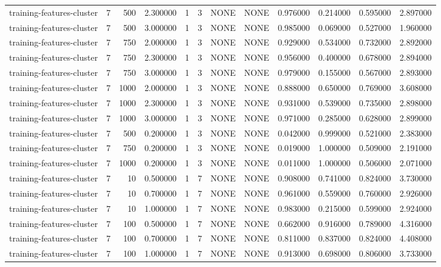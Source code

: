 \begin{tabular}{lrrrllllrrrr}
training-features-cluster & 7 & 500 & 2.300000 & 1 & 3 & NONE & NONE & 0.976000 & 0.214000 & 0.595000 & 2.897000 \\
training-features-cluster & 7 & 500 & 3.000000 & 1 & 3 & NONE & NONE & 0.985000 & 0.069000 & 0.527000 & 1.960000 \\
training-features-cluster & 7 & 750 & 2.000000 & 1 & 3 & NONE & NONE & 0.929000 & 0.534000 & 0.732000 & 2.892000 \\
training-features-cluster & 7 & 750 & 2.300000 & 1 & 3 & NONE & NONE & 0.956000 & 0.400000 & 0.678000 & 2.894000 \\
training-features-cluster & 7 & 750 & 3.000000 & 1 & 3 & NONE & NONE & 0.979000 & 0.155000 & 0.567000 & 2.893000 \\
training-features-cluster & 7 & 1000 & 2.000000 & 1 & 3 & NONE & NONE & 0.888000 & 0.650000 & 0.769000 & 3.608000 \\
training-features-cluster & 7 & 1000 & 2.300000 & 1 & 3 & NONE & NONE & 0.931000 & 0.539000 & 0.735000 & 2.898000 \\
training-features-cluster & 7 & 1000 & 3.000000 & 1 & 3 & NONE & NONE & 0.971000 & 0.285000 & 0.628000 & 2.899000 \\
training-features-cluster & 7 & 500 & 0.200000 & 1 & 3 & NONE & NONE & 0.042000 & 0.999000 & 0.521000 & 2.383000 \\
training-features-cluster & 7 & 750 & 0.200000 & 1 & 3 & NONE & NONE & 0.019000 & 1.000000 & 0.509000 & 2.191000 \\
training-features-cluster & 7 & 1000 & 0.200000 & 1 & 3 & NONE & NONE & 0.011000 & 1.000000 & 0.506000 & 2.071000 \\
training-features-cluster & 7 & 10 & 0.500000 & 1 & 7 & NONE & NONE & 0.908000 & 0.741000 & 0.824000 & 3.730000 \\
training-features-cluster & 7 & 10 & 0.700000 & 1 & 7 & NONE & NONE & 0.961000 & 0.559000 & 0.760000 & 2.926000 \\
training-features-cluster & 7 & 10 & 1.000000 & 1 & 7 & NONE & NONE & 0.983000 & 0.215000 & 0.599000 & 2.924000 \\
training-features-cluster & 7 & 100 & 0.500000 & 1 & 7 & NONE & NONE & 0.662000 & 0.916000 & 0.789000 & 4.316000 \\
training-features-cluster & 7 & 100 & 0.700000 & 1 & 7 & NONE & NONE & 0.811000 & 0.837000 & 0.824000 & 4.408000 \\
training-features-cluster & 7 & 100 & 1.000000 & 1 & 7 & NONE & NONE & 0.913000 & 0.698000 & 0.806000 & 3.733000 \\

\end{tabular}
